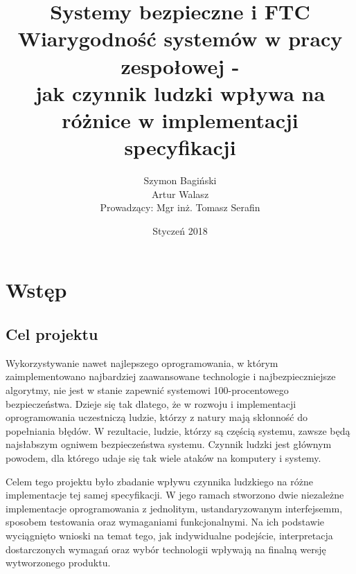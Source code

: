 \documentclass[12pt, notitlepage]{article}
\begin{document}
\begin{titlepage}
    \thispagestyle{empty}
    \title{\textbf{\Huge Systemy bezpieczne i FTC \\[1cm]\LARGE Wiarygodność systemów w pracy zespołowej - \\ jak czynnik ludzki wpływa na różnice w implementacji specyfikacji}}
    \author{Szymon Bagiński \\ Artur Walasz \\[1cm]{\small Prowadzący: Mgr inż. Tomasz Serafin}}
    \date{Styczeń 2018}
    \maketitle
    \vfill
    \begin{center}
        \Large \bfseries\contentsname
    \end{center}
    \tableofcontents
    \vfill
\end{titlepage}    


\section{Wstęp}

\subsection{Cel projektu}

Wykorzystywanie nawet najlepszego oprogramowania, w którym zaimplementowano najbardziej zaawansowane technologie i najbezpieczniejsze algorytmy, nie jest w stanie zapewnić systemowi 100-procentowego bezpieczeństwa. Dzieje się tak dlatego, że w rozwoju i implementacji oprogramowania uczestniczą ludzie, którzy z natury mają skłonność do popełniania błędów. W rezultacie, ludzie, którzy są częścią systemu, zawsze będą najsłabszym ogniwem bezpieczeństwa systemu. Czynnik ludzki jest głównym powodem, dla którego udaje się tak wiele ataków na komputery i systemy.

Celem tego projektu było zbadanie wpływu czynnika ludzkiego na różne implementacje tej samej specyfikacji. W jego ramach stworzono dwie niezależne implementacje oprogramowania z jednolitym, ustandaryzowanym interfejsemm, sposobem testowania oraz wymaganiami funkcjonalnymi. Na ich podstawie wyciągnięto wnioski na temat tego, jak indywidualne podejście, interpretacja dostarczonych wymagań oraz wybór technologii wpływają na finalną wersję wytworzonego produktu.
\end{document}
